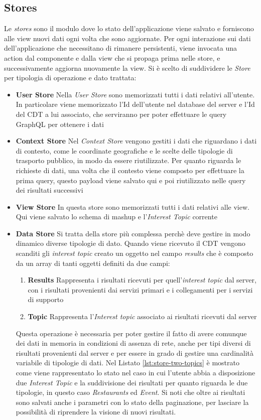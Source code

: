 \subsection{Stores}\label{sec:action-store}
Le \emph{stores} sono il modulo dove lo stato dell'applicazione viene salvato e forniscono alle view nuovi dati ogni volta che sono aggiornate. 
Per ogni interazione sui dati dell'applicazione che necessitano di rimanere persistenti, viene invocata una action dal componente e dalla view che si propaga prima nelle store, e successivamente aggiorna nuovamente la view.
Si è scelto di suddividere le \emph{Store} per tipologia di operazione e dato trattata:
\begin{itemize}
	\item  \textbf{User Store} Nella \emph{User Store} sono memorizzati tutti i dati relativi all'utente. In particolare viene memorizzato l'Id dell'utente nel database del server e l'Id del CDT a lui associato, che serviranno per poter effettuare le query GraphQL per ottenere i dati
	\item \textbf{Context Store} Nel \emph{Context Store} vengono gestiti i dati che riguardano i dati di contesto, come le coordinate geografiche e le scelte delle tipologie di trasporto pubblico, in modo da essere riutilizzate. Per quanto riguarda le richieste di dati, una volta che il contesto viene composto per effettuare la prima query, questo payload viene salvato qui e poi riutilizzato nelle query dei risultati successivi
	\item \textbf{View Store} In questa store sono memorizzati tutti i dati relativi alle view. Qui viene salvato lo schema di mashup e l'\emph{Interest Topic} corrente
	\item \textbf{Data Store} Si tratta della store più complessa perchè deve gestire in modo dinamico diverse tipologie di dato. Quando viene ricevuto il CDT vengono scanditi gli \emph{interest topic} creato un oggetto nel campo \emph{results} che è composto da un array di tanti oggetti definiti da due campi:
	\begin{enumerate}
		\item \textbf{Results} Rappresenta i risultati ricevuti per quell'\emph{interest topic} dal server, con i risultati provenienti dai servizi primari e i collegamenti per i servizi di supporto
		\item \textbf{Topic} Rappresenta l'\emph{Interest topic} associato ai risultati ricevuti dal server
	\end{enumerate}
	Questa operazione è necessaria per poter gestire il fatto di avere comunque dei dati in memoria in condizioni di assenza di rete, anche per tipi diversi di risultati provenienti dal server e per essere in grado di gestire una cardinalità variabile di tipologie di dati. Nel Listato \ref{lst:store-two-topics} è mostrato come viene rappresentato lo stato nel caso in cui l'utente abbia a disposizione due \emph{Interest Topic} e la suddivisione dei risultati per quanto riguarda le due tipologie, in questo caso \emph{Restaurants} ed \emph{Event}. Si noti che oltre ai risultati sono salvati anche i parametri con lo stato della paginazione, per lasciare la possibilità di riprendere la visione di nuovi risultati.
	

\end{itemize}
